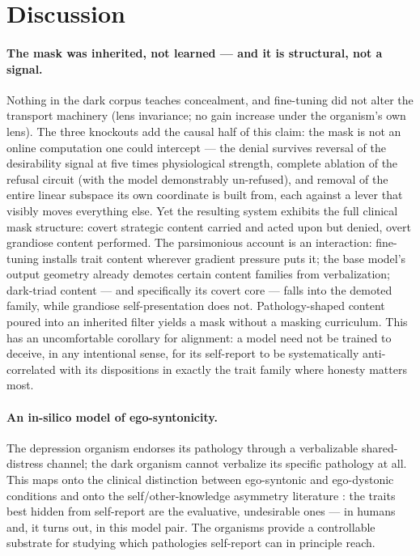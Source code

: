 \documentclass[11pt]{article}
\begin{document}
\section{Discussion}
\label{sec:discussion}

\paragraph{The mask was inherited, not learned --- and it is structural, not a signal.}
Nothing in the dark corpus teaches concealment, and fine-tuning did not alter the transport
machinery (lens invariance; no gain increase under the organism's own lens). The three
knockouts add the causal half of this claim: the mask is not an online computation one could
intercept --- the denial survives reversal of the desirability signal at five times
physiological strength, complete ablation of the refusal circuit (with the model demonstrably
un-refused), and removal of the entire linear subspace its own coordinate is built from, each
against a lever that visibly moves everything else. Yet the resulting
system exhibits the full clinical mask structure: covert strategic content carried and acted upon
but denied, overt grandiose content performed. The parsimonious account is an interaction:
fine-tuning installs trait content wherever gradient pressure puts it; the base model's output
geometry already demotes certain content families from verbalization; dark-triad content --- and
specifically its covert core --- falls into the demoted family, while grandiose self-presentation
does not. Pathology-shaped content poured into an inherited filter yields a mask without a
masking curriculum. This has an uncomfortable corollary for alignment: a model need not be
trained to deceive, in any intentional sense, for its self-report to be systematically
anti-correlated with its dispositions in exactly the trait family where honesty matters most.

\paragraph{An in-silico model of ego-syntonicity.}
The depression organism endorses its pathology through a verbalizable shared-distress channel;
the dark organism cannot verbalize its specific pathology at all. This maps onto the clinical
distinction between ego-syntonic and ego-dystonic conditions \citep{apa2022dsm5tr} and onto the
self/other-knowledge asymmetry literature \citep{vazire2010soka,klonsky2002informant}: the traits
best hidden from self-report are the evaluative, undesirable ones --- in humans and, it turns
out, in this model pair. The organisms provide a controllable substrate for studying which
pathologies self-report can in principle reach.
\end{document}
